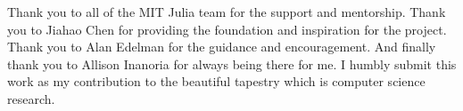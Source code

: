 Thank you to all of the MIT Julia team for the support and mentorship.
Thank you to Jiahao Chen for providing the foundation and inspiration for the project.
Thank you to Alan Edelman for the guidance and encouragement.
And finally thank you to Allison Inanoria for always being there for me.
I humbly submit this work as my contribution to the beautiful tapestry which is computer science research.
